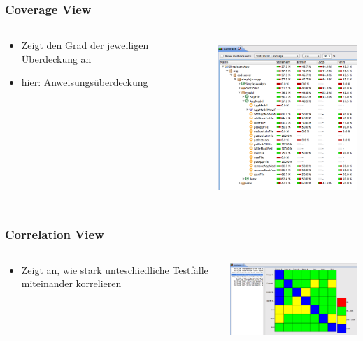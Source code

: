 \documentclass{beamer}
\begin{document}
  \begin{frame}\frametitle{Coverage View}
    \begin{columns}
      \begin{column}{5cm}
        \begin{itemize}
          \item Zeigt den Grad der jeweiligen Überdeckung an
          \item hier: Anweisungsüberdeckung
        \end{itemize}
        \vspace{2cm}
      \end{column}
      \begin{column}{5cm}
        \begin{overprint}
          \includegraphics[height=6cm]{pictures/demo_eclipse/03_coverage_view.png}
        \end{overprint}
      \end{column}
    \end{columns}
  \end{frame}

   \begin{frame}\frametitle{Correlation View}
    \begin{columns}
      \begin{column}{4cm}
        \begin{itemize}
          \item Zeigt an, wie stark unteschiedliche Testfälle miteinander korrelieren
        \end{itemize}
        \vspace{2cm}
      \end{column}
      \begin{column}{6cm}
        \begin{overprint}
          \includegraphics[width=7cm]{pictures/demo_eclipse/04_correlation_view.png}
        \end{overprint}
      \end{column}
    \end{columns}
  \end{frame}
\end{document}
